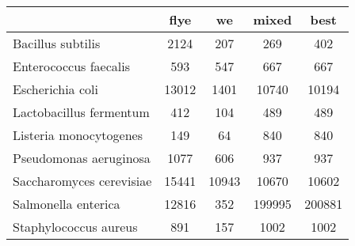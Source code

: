 \begin{minipage}{0.91\textwidth}
\begin{adjustbox}{center}
\begin{tabular}{|l||c|c|c|c|}
\hline
 & flye & we & mixed & best \\
\hline
\hline
Bacillus subtilis & \cellcolor[RGB]{235, 71, 71} 2124 & \cellcolor[RGB]{227, 227, 252} 207 & \cellcolor[RGB]{241, 241, 253} 269 & \cellcolor[RGB]{253, 237, 237} 402 \\
\hline
Enterococcus faecalis & \cellcolor[RGB]{241, 241, 253} 593 & \cellcolor[RGB]{227, 227, 252} 547 & \cellcolor[RGB]{253, 241, 241} 667 & \cellcolor[RGB]{253, 241, 241} 667 \\
\hline
Escherichia coli & \cellcolor[RGB]{253, 237, 237} 13012 & \cellcolor[RGB]{218, 218, 251} 1401 & \cellcolor[RGB]{255, 255, 255} 10740 & \cellcolor[RGB]{255, 255, 255} 10194 \\
\hline
Lactobacillus fermentum & \cellcolor[RGB]{250, 250, 254} 412 & \cellcolor[RGB]{223, 223, 251} 104 & \cellcolor[RGB]{254, 250, 250} 489 & \cellcolor[RGB]{254, 250, 250} 489 \\
\hline
Listeria monocytogenes & \cellcolor[RGB]{237, 237, 253} 149 & \cellcolor[RGB]{232, 232, 252} 64 & \cellcolor[RGB]{252, 232, 232} 840 & \cellcolor[RGB]{252, 232, 232} 840 \\
\hline
Pseudomonas aeruginosa & \cellcolor[RGB]{252, 227, 227} 1077 & \cellcolor[RGB]{218, 218, 251} 606 & \cellcolor[RGB]{255, 255, 255} 937 & \cellcolor[RGB]{255, 255, 255} 937 \\
\hline
Saccharomyces cerevisiae & \cellcolor[RGB]{235, 71, 71} 15441 & \cellcolor[RGB]{253, 237, 237} 10943 & \cellcolor[RGB]{237, 237, 253} 10670 & \cellcolor[RGB]{227, 227, 252} 10602 \\
\hline
Salmonella enterica & \cellcolor[RGB]{232, 232, 252} 12816 & \cellcolor[RGB]{232, 232, 252} 352 & \cellcolor[RGB]{252, 232, 232} 199995 & \cellcolor[RGB]{252, 232, 232} 200881 \\
\hline
Staphylococcus aureus & \cellcolor[RGB]{250, 250, 254} 891 & \cellcolor[RGB]{218, 218, 251} 157 & \cellcolor[RGB]{254, 250, 250} 1002 & \cellcolor[RGB]{254, 250, 250} 1002 \\
\hline
\end{tabular}
\end{adjustbox}
\end{minipage}
